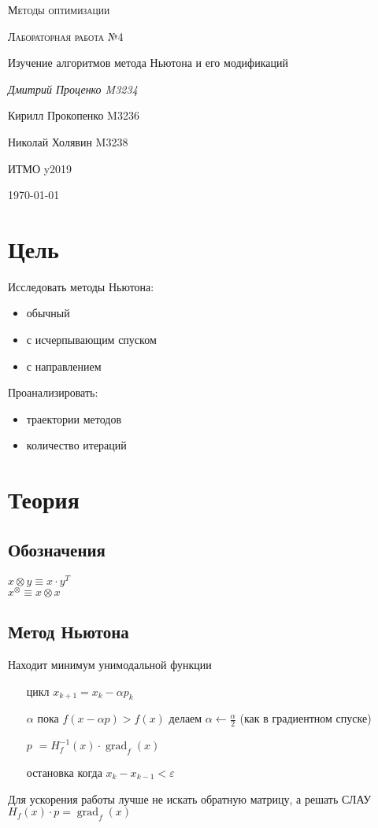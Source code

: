 \documentclass[russian, english]{article}
\begin{document}
\begin{titlepage}
\centering
	{\scshape\LARGE Методы оптимизации \par}
	\vspace{1cm}
	{\scshape\Large Лабораторная работа №4\par Изучение алгоритмов метода Ньютона и его модификаций\par}
	\vspace{2cm}
	{\Large\itshape Дмитрий Проценко M3234 \par
	Кирилл Прокопенко M3236 \par
	Николай Холявин M3238 \par}
	\vfill
	ИТМО y2019
	\vfill
	{\large \today\par}
\end{titlepage}

\tableofcontents
\newpage

\section{Цель}
Исследовать методы Ньютона:
\begin{itemize}
	\item обычный
	\item с исчерпывающим спуском
	\item с направлением
\end{itemize}
Проанализировать:
\begin{itemize}
	\item траектории методов
	\item количество итераций
\end{itemize}

\section{Теория}
\subsection{Обозначения}
$x\otimes y\equiv x\cdot y^T$\\
$x^\otimes \equiv x\otimes x$\\
\subsection{Метод Ньютона}
Находит минимум унимодальной функции
\begin{itemize}
	\item[цикл] $x_{k+1} = x_{k} - \alpha p_{k}$
	\item[$\alpha$] пока $f(x - \alpha p) > f(x)$ делаем $\alpha\leftarrow \frac{\alpha}{2}$ (как в градиентном спуске)
	\item[$p$] $= H_f^{-1}(x)\cdot\operatorname{grad}_f(x)$
	\item[остановка] когда $x_k - x_{k - 1} < \varepsilon$
\end{itemize}
Для ускорения работы лучше не искать обратную матрицу, а решать СЛАУ $H_f(x)\cdot p=\operatorname{grad}_f(x)$
\end{document}
